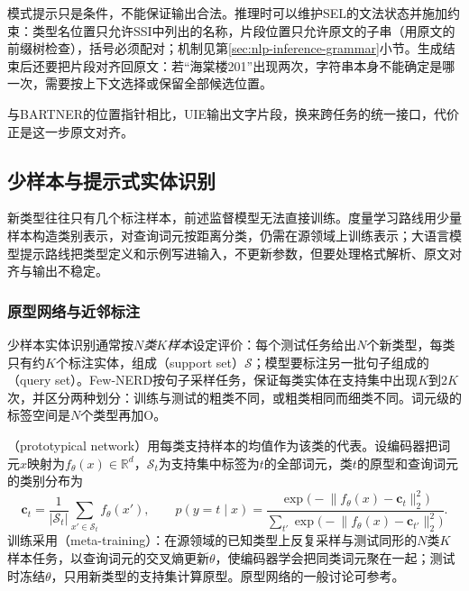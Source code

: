 模式提示只是条件，不能保证输出合法。推理时可以维护SEL的文法状态并施加约束：类型名位置只允许SSI中列出的名称，片段位置只允许原文的子串（用原文的前缀树检查），括号必须配对；机制见第\ref{sec:nlp-inference-grammar}小节。生成结束后还要把片段对齐回原文：若“海棠楼201”出现两次，字符串本身不能确定是哪一次，需要按上下文选择或保留全部候选位置。

与BARTNER的位置指针相比，UIE输出文字片段，换来跨任务的统一接口，代价正是这一步原文对齐。

\subsection{少样本与提示式实体识别}
\label{sec:nlp-extraction-ner-fewshot}

新类型往往只有几个标注样本，前述监督模型无法直接训练。度量学习路线用少量样本构造类别表示，对查询词元按距离分类，仍需在源领域上训练表示；大语言模型提示路线把类型定义和示例写进输入，不更新参数，但要处理格式解析、原文对齐与输出不稳定。

\subsubsection{原型网络与近邻标注}
\label{sec:nlp-extraction-prototype}

少样本实体识别通常按\emph{$N$类$K$样本}设定评价：每个测试任务给出$N$个新类型，每类只有约$K$个标注实体，组成（support set）$\mathcal S$；模型要标注另一批句子组成的（query set）。Few-NERD按句子采样任务，保证每类实体在支持集中出现$K$到$2K$次，并区分两种划分：训练与测试的粗类不同，或粗类相同而细类不同。词元级的标签空间是$N$个类型再加O。

（prototypical network）用每类支持样本的均值作为该类的代表。设编码器把词元$x$映射为$f_\theta(x)\in\mathbb R^{d}$，$\mathcal S_t$为支持集中标签为$t$的全部词元，类$t$的原型和查询词元的类别分布为
\begin{equation}
  \bm c_t=\frac{1}{|\mathcal S_t|}\sum_{x'\in\mathcal S_t}f_\theta(x'),\qquad
  p(y=t\mid x)=\frac{\exp\bigl(-\lVert f_\theta(x)-\bm c_t\rVert_2^2\bigr)}{\sum_{t'}\exp\bigl(-\lVert f_\theta(x)-\bm c_{t'}\rVert_2^2\bigr)}.
  \label{eq:nlp-extraction-prototype}
\end{equation}
训练采用（meta-training）：在源领域的已知类型上反复采样与测试同形的$N$类$K$样本任务，以查询词元的交叉熵更新$\theta$，使编码器学会把同类词元聚在一起；测试时冻结$\theta$，只用新类型的支持集计算原型。原型网络的一般讨论可参考。

